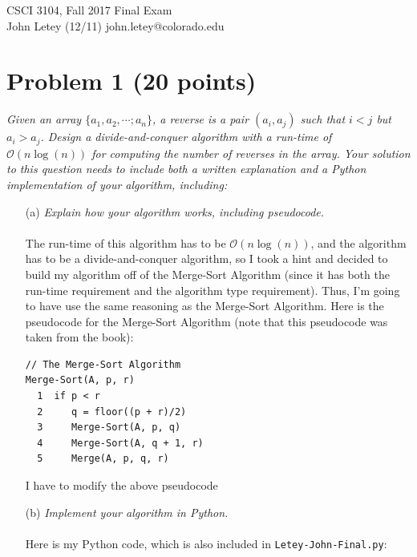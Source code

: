 \documentclass[12pt]{article}
\begin{document}
CSCI 3104, Fall 2017 \hfill Final Exam\\
John Letey (12/11) \hfill john.letey@colorado.edu\vspace{-11mm}

\hrulefill

{\selectfont\vspace{-8mm}
\section*{{\selectfont Problem 1 (20 points)}}\vspace{-10mm}
\textsl{Given an array $\{a_1, a_2, \cdots; a_n\}$, a reverse is a pair $(a_i, a_j)$ such that $i < j$ but $a_i > a_j$. Design a divide-and-conquer algorithm with a run-time of $\mathcal{O}(n\log(n))$ for computing the number of reverses in the array. Your solution to this question needs to include both a written explanation and a Python implementation of your algorithm, including:}
\begin{enumerate}
\item[(a)]\textsl{Explain how your algorithm works, including pseudocode.}\\ \\
The run-time of this algorithm has to be $\mathcal{O}(n\log(n))$, and the algorithm has to be a divide-and-conquer algorithm, so I took a hint and decided to build my algorithm off of the Merge-Sort Algorithm (since it has both the run-time requirement and the algorithm type requirement). Thus, I'm going to have use the same reasoning as the Merge-Sort Algorithm. Here is the pseudocode for the Merge-Sort Algorithm (note that this pseudocode was taken from the book):
\begin{verbatim}
// The Merge-Sort Algorithm
Merge-Sort(A, p, r)
  1  if p < r
  2     q = floor((p + r)/2)
  3     Merge-Sort(A, p, q)
  4     Merge-Sort(A, q + 1, r)
  5     Merge(A, p, q, r)
\end{verbatim}
I have to modify the above pseudocode
\item[(b)]\textsl{Implement your algorithm in Python.}\\ \\
Here is my Python code, which is also included in \texttt{Letey-John-Final.py}:


\end{enumerate}}
\end{document}
